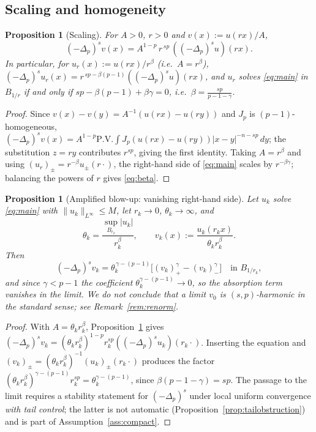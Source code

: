 \documentclass[11pt]{amsart}
\theoremstyle{plain}
\newtheorem{proposition}[theorem]{Proposition}
\theoremstyle{definition}
\theoremstyle{remark}
\newcommand{\fpl}[1]{(-\Delta_p)^{s}#1}
\begin{document}
\subsection{Scaling and homogeneity}
\begin{proposition}[Scaling]\label{prop:scaling}
For $A>0$, $r>0$ and $v(x):=u(rx)/A$,
\[
  \fpl{v}(x)=A^{1-p}\,r^{\,sp}\,(\fpl{u})(rx).
\]
In particular, for $u_r(x):=u(rx)/r^{\beta}$ (i.e.\ $A=r^{\beta}$),
$\fpl{u_r}(x)=r^{\,sp-\beta(p-1)}(\fpl{u})(rx)$, and $u_r$ solves
\eqref{eq:main} in $B_{1/r}$ if and only if $sp-\beta(p-1)+\beta\gamma=0$, i.e.\
$\beta=\frac{sp}{p-1-\gamma}$.
\end{proposition}
\begin{proof}
Since $v(x)-v(y)=A^{-1}(u(rx)-u(ry))$ and $J_p$ is $(p-1)$-homogeneous,
$\fpl{v}(x)=A^{1-p}\mathrm{P.V.}\!\int J_p(u(rx)-u(ry))|x-y|^{-n-sp}\,dy$; the
substitution $z=ry$ contributes $r^{sp}$, giving the first identity. Taking
$A=r^{\beta}$ and using $(u_r)_\pm=r^{-\beta}u_\pm(r\cdot)$, the right-hand side
of \eqref{eq:main} scales by $r^{-\beta\gamma}$; balancing the powers of $r$
gives \eqref{eq:beta}.
\end{proof}

\begin{proposition}[Amplified blow-up: vanishing right-hand side]\label{prop:homog}
Let $u_k$ solve \eqref{eq:main} with $\|u_k\|_{L^\infty}\le M$, let $r_k\to0$,
$\theta_k\to\infty$, and
\[
  \theta_k=\frac{\sup_{B_{r_k}}|u_k|}{r_k^{\beta}},\qquad
  v_k(x):=\frac{u_k(r_kx)}{\theta_k r_k^{\beta}}.
\]
Then
\[
  \fpl{v_k}=\theta_k^{\,\gamma-(p-1)}
   \big[(v_k)_+^{\gamma}-(v_k)_-^{\gamma}\big]\quad\text{in }B_{1/r_k},
\]
and since $\gamma<p-1$ the coefficient $\theta_k^{\gamma-(p-1)}\to0$, so the
absorption term vanishes in the limit. We do \emph{not} conclude that a limit
$v_0$ is $(s,p)$-harmonic in the standard sense; see
Remark~\ref{rem:renorm}.
\end{proposition}
\begin{proof}
With $A=\theta_k r_k^\beta$, Proposition~\ref{prop:scaling} gives
$\fpl{v_k}=(\theta_k r_k^\beta)^{1-p}r_k^{sp}(\fpl{u_k})(r_k\cdot)$. Inserting
the equation and $(v_k)_\pm=(\theta_kr_k^\beta)^{-1}(u_k)_\pm(r_k\cdot)$
produces the factor $(\theta_kr_k^\beta)^{\gamma-(p-1)}r_k^{sp}
=\theta_k^{\gamma-(p-1)}$, since $\beta(p-1-\gamma)=sp$. The passage to the
limit requires a stability statement for $\fpl{}$ under local uniform
convergence \emph{with tail control}; the latter is not automatic
(Proposition~\ref{prop:tailobstruction}) and is part of
Assumption~\ref{ass:compact}.
\end{proof}
\end{document}
